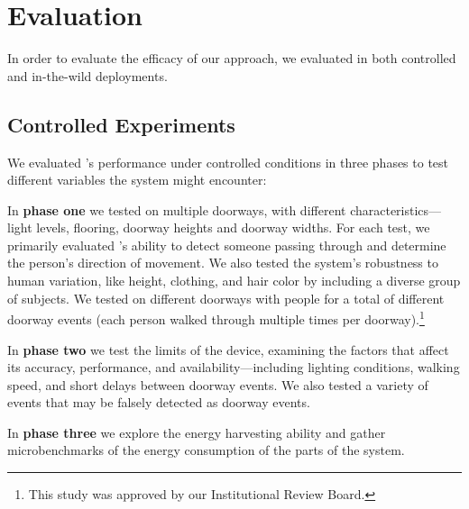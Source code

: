 \section{Evaluation}
\label{sec:evaluation}
In order to evaluate the efficacy of our approach, we evaluated \sysname in both controlled and in-the-wild deployments.  

\subsection{Controlled Experiments} 
We evaluated \sysname's performance under controlled conditions in three phases to test different variables the system might encounter:

In \textbf{phase one} we tested \sysname on multiple doorways, with different characteristics---light levels, flooring, doorway heights and doorway widths.
For each test, we primarily evaluated \sysname's ability to detect someone passing through and determine the person's direction of movement.
We also tested the system's robustness to human variation, like height, clothing, and hair color by including a diverse group of subjects.
We tested on \numDoors different doorways with \numPeople people for a total of \numExp different doorway events (each person walked through multiple times per doorway).\footnote{This study was approved by our Institutional Review Board.}

In \textbf{phase two} we test the limits of the device, examining the factors that affect its accuracy, performance, and availability---including lighting conditions, walking speed, and short delays between doorway events.
We also tested a variety of events that may be falsely detected as doorway events.

In \textbf{phase three} we explore the energy harvesting ability and gather microbenchmarks of the energy consumption of the parts of the \sysname system.

